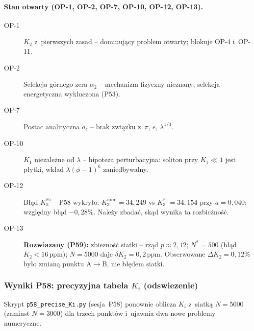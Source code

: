 \paragraph{Stan otwarty (OP-1, OP-2, OP-7, OP-10, OP-12, OP-13).}
\begin{description}
  \item[OP-1] $K_2$ z~pierwszych zasad -- dominuj\k{a}cy problem otwarty;
              blokuje OP-4 i~OP-11.
  \item[OP-2] Selekcja g\'ornego zera $\alpha_2$ -- mechanizm fizyczny
              nieznany; selekcja energetyczna wykluczona (P53).
  \item[OP-7] Postac analityczna $a_c$ -- brak zwi\k{a}zku z~$\pi$, $e$,
              $\lambda^{1/4}$.
  \item[OP-10] $K_1$ niezale\.zne od $\lambda$ -- hipoteza perturbacyjna:
               soliton przy $K_1\ll1$ jest p\l{}ytki, wk\l{}ad
               $\lambda(\phi-1)^6$ zaniedbywalny.
  \item[OP-12] B\l{}\k{a}d $K_3^{\mathrm{Ei}}$ -- P58 wykry\l{}o:
               $K_3^{\mathrm{num}}=34{,}249$ vs $K_3^{\mathrm{Ei}}=34{,}154$
               przy $a=0{,}040$; wzgl\k{e}dny b\l{}\k{a}d $-0{,}28\%$.
               Nale\.zy zbada\'c, sk\k{a}d wynika ta rozbie\.zno\'s\'c.
  \item[OP-13] \textbf{Rozwiazany (P59):} zbiezno\'s\'c siatki --
               rz\k{a}d $p\approx2{,}12$; $N^*=500$
               (b\l{}\k{a}d $K_2<16\,\mathrm{ppm}$);
               $N=5000$ daje $\delta K_2=0{,}2\,\mathrm{ppm}$.
               Obserwowane $\Delta K_2=0{,}12\%$ by\l{}o zmian\k{a}
               punktu A$\to$B, nie b\l{}\k{e}dem siatki.
\end{description}

\subsubsection{Wyniki P58: precyzyjna tabela $K_i$ (odswiezenie)}%
\label{app:F-P58}

Skrypt \texttt{p58\_precise\_Ki.py} (sesja~P58) ponownie oblicza $K_i$
z~siatk\k{a} $N=5000$ (zamiast $N=3000$) dla trzech punkt\'ow i~ujawnia
dwa nowe problemy numeryczne.

